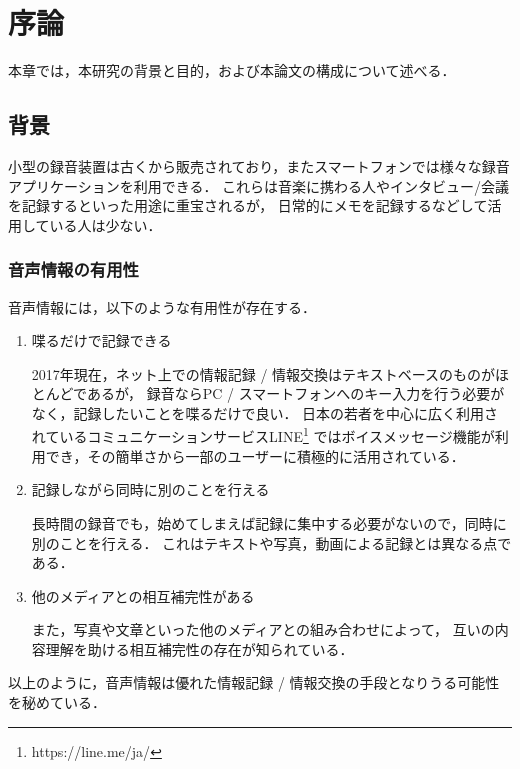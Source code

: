 \chapter{序論}
\label{chap:introduction}

本章では，本研究の背景と目的，および本論文の構成について述べる．

\newpage

\section{背景}

小型の録音装置は古くから販売されており，またスマートフォンでは様々な録音アプリケーションを利用できる．
これらは音楽に携わる人やインタビュー/会議を記録するといった用途に重宝されるが，
日常的にメモを記録するなどして活用している人は少ない．

\subsection{音声情報の有用性}

音声情報には，以下のような有用性が存在する．

\begin{enumerate}

\item 喋るだけで記録できる

2017年現在，ネット上での情報記録 / 情報交換はテキストベースのものがほとんどであるが，
録音ならPC / スマートフォンへのキー入力を行う必要がなく，記録したいことを喋るだけで良い．
日本の若者を中心に広く利用されているコミュニケーションサービスLINE\footnote{\textsf{https://line.me/ja/}}
ではボイスメッセージ機能が利用でき，その簡単さから一部のユーザーに積極的に活用されている．

\item 記録しながら同時に別のことを行える

長時間の録音でも，始めてしまえば記録に集中する必要がないので，同時に別のことを行える．
これはテキストや写真，動画による記録とは異なる点である．

\item 他のメディアとの相互補完性がある

また，写真や文章といった他のメディアとの組み合わせによって，
互いの内容理解を助ける相互補完性の存在が知られている\cite{Nakakura}．

\end{enumerate}

以上のように，音声情報は優れた情報記録 / 情報交換の手段となりうる可能性を秘めている．

